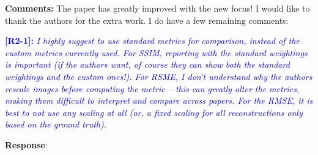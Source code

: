 \documentclass[11pt]{article}
\begin{document}
\textbf{Comments:} The paper has greatly improved with the new focus! I
would like to thank the authors for the extra work. I do have a few
remaining comments:

\vspace{0.5cm}\textcolor{blue}{\textbf{[R2-1]:} \textit{I highly suggest to use
    standard metrics for comparison, instead of the custom metrics
    currently used. For SSIM, reporting with the standard weightings
    is important (if the authors want, of course they can show both
    the standard weightings and the custom ones!). For RSME, I don't
    understand why the authors rescale images before computing the
    metric -- this can greatly alter the metrics, making them
    difficult to interpret and compare across papers. For the RMSE, it
    is best to not use any scaling at all (or, a fixed scaling for all
    reconstructions only based on the ground truth).  }}

\textbf{Response}:
\end{document}
